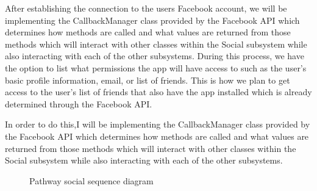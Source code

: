 \documentclass{article}
\begin{document}
After establishing the connection to the users Facebook account, we will be implementing the CallbackManager class provided by the Facebook API which determines how methods are called and what values are returned from those methods which will interact with other classes within the Social subsystem while also interacting with each of the other subsystems. During this process, we have the option to list what permissions the app will have access to such as the user's basic profile information, email, or list of friends. This is how we plan to get access to the user's list of friends that also have the app installed which is already determined through the Facebook API.

In order to do this,I will be implementing the CallbackManager class provided by the Facebook API which determines how methods are called and what values are returned from those methods which will interact with other classes within the Social subsystem while also interacting with each of the other subsystems.

\begin{figure}[H]
    \centering
    \begin{center}
    \end{center}
    \caption{Pathway social sequence diagram}
    \label{fig:my_label}
\end{figure}
\end{document}

